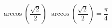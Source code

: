  {$\arccos \left( \dfrac{\sqrt{2}}{2} \right)$}
{ $\arccos \left( \dfrac{\sqrt{2}}{2} \right) = \dfrac{\pi}{4}$}
